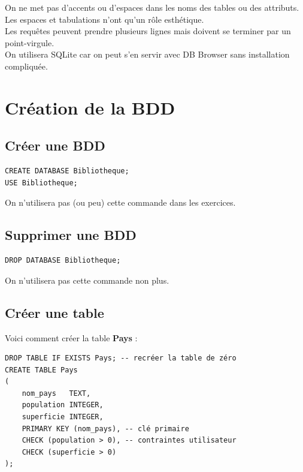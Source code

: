On ne met pas d'accents ou d'espaces dans les noms des tables ou des attributs.\\

Les espaces et tabulations n'ont qu'un rôle esthétique.\\

Les requêtes peuvent prendre plusieurs lignes mais doivent se terminer par un point-virgule.\\

On utilisera SQLite car on peut s'en servir avec DB Browser sans installation compliquée.

\section{Création de la BDD}
\subsection{Créer une BDD}

\begin{sql}
    \begin{verbatim}
CREATE DATABASE Bibliotheque;
USE Bibliotheque;
\end{verbatim}
\end{sql}

On n'utilisera pas (ou peu) cette commande dans les exercices.


\subsection{Supprimer une BDD}

\begin{sql}
    \begin{verbatim}
DROP DATABASE Bibliotheque;
	\end{verbatim}
\end{sql}

On n'utilisera pas cette commande non plus.


\subsection{Créer une table}
Voici comment créer la table \textbf{Pays} :

\begin{sql}
    \begin{verbatim}
DROP TABLE IF EXISTS Pays; -- recréer la table de zéro
CREATE TABLE Pays
(
    nom_pays   TEXT,
    population INTEGER,
    superficie INTEGER,
    PRIMARY KEY (nom_pays), -- clé primaire
    CHECK (population > 0), -- contraintes utilisateur
    CHECK (superficie > 0)
);
\end{verbatim}
\end{sql}



